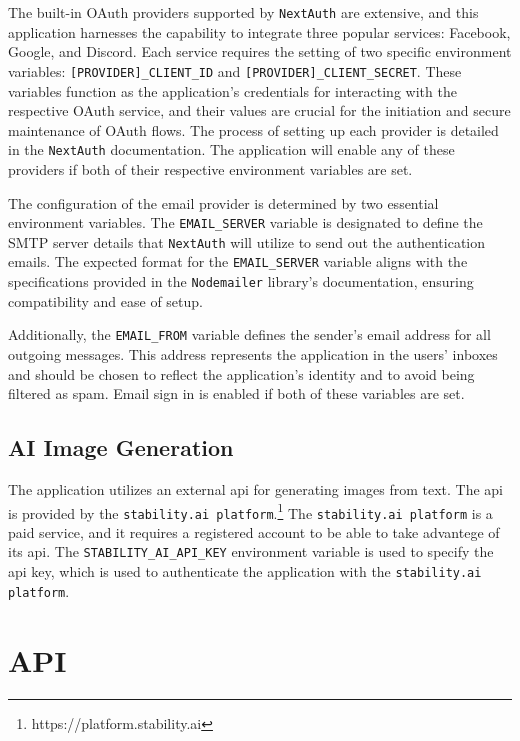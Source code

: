The built-in OAuth providers supported by \texttt{NextAuth} are extensive\cite{auth-oauth}, and this application harnesses the capability to integrate three popular services: Facebook, Google, and Discord. Each service requires the setting of two specific environment variables: \texttt{[PROVIDER]\_CLIENT\_ID} and \texttt{[PROVIDER]\_CLIENT\_SECRET}. These variables function as the application's credentials for interacting with the respective OAuth service, and their values are crucial for the initiation and secure maintenance of OAuth flows. The process of setting up each provider is detailed in the \texttt{NextAuth} documentation\cite{auth-oauth}. The application will enable any of these providers if both of their respective environment variables are set.

The configuration of the email provider is determined by two essential environment variables. The \texttt{EMAIL\_SERVER} variable is designated to define the SMTP server details that \texttt{NextAuth} will utilize to send out the authentication emails. The expected format for the \texttt{EMAIL\_SERVER} variable aligns with the specifications provided in the \texttt{Nodemailer} library's documentation\cite{nodemailer-smtp}, ensuring compatibility and ease of setup.

Additionally, the \texttt{EMAIL\_FROM} variable defines the sender's email address for all outgoing messages. This address represents the application in the users' inboxes and should be chosen to reflect the application's identity and to avoid being filtered as spam. Email sign in is enabled if both of these variables are set.

\subsection{AI Image Generation}

The application utilizes an external \acrshort{api} for generating images from text. The \acrshort{api} is provided by the \texttt{stability.ai platform}.\footnote{https://platform.stability.ai} The \texttt{stability.ai platform} is a paid service, and it requires a registered account to be able to take advantege of its \acrshort{api}. The \texttt{STABILITY\_AI\_API\_KEY} environment variable is used to specify the \acrshort{api} key, which is used to authenticate the application with the \texttt{stability.ai platform}.

\section{API}

